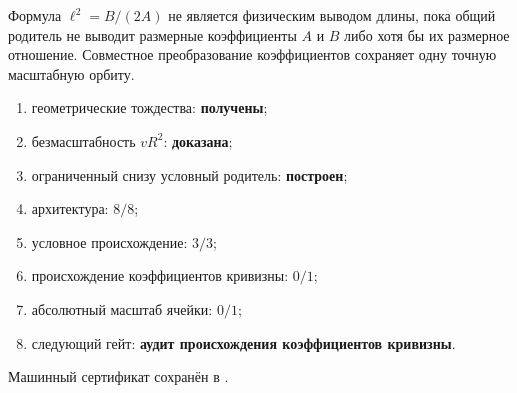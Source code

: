 \begin{nogocriterion}
Формула $\ell^2=B/(2A)$ не является физическим выводом длины, пока общий
родитель не выводит размерные коэффициенты $A$ и $B$ либо хотя бы их
размерное отношение. Совместное преобразование коэффициентов сохраняет
одну точную масштабную орбиту.
\end{nogocriterion}

\begin{protocol}\begin{enumerate}\raggedright
\item геометрические тождества: \textbf{получены};
\item безмасштабность $vR^2$: \textbf{доказана};
\item ограниченный снизу условный родитель: \textbf{построен};
\item архитектура: \textbf{$8/8$};
\item условное происхождение: \textbf{$3/3$};
\item происхождение коэффициентов кривизны: \textbf{$0/1$};
\item абсолютный масштаб ячейки: \textbf{$0/1$};
\item следующий гейт: \textbf{аудит происхождения коэффициентов кривизны}.
\end{enumerate}\end{protocol}

Машинный сертификат сохранён в
.